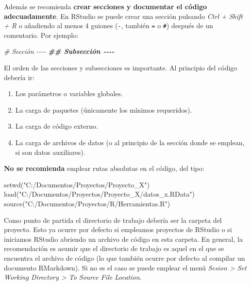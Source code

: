 \documentclass[
]{book}
\newenvironment{Shaded}{\begin{snugshade}}{\end{snugshade}}
\newcommand{\CommentTok}[1]{\textcolor[rgb]{0.56,0.35,0.01}{\textit{#1}}}
\newcommand{\DocumentationTok}[1]{\textcolor[rgb]{0.56,0.35,0.01}{\textbf{\textit{#1}}}}
\newcommand{\FunctionTok}[1]{\textcolor[rgb]{0.00,0.00,0.00}{#1}}
\newcommand{\NormalTok}[1]{#1}
\newcommand{\StringTok}[1]{\textcolor[rgb]{0.31,0.60,0.02}{#1}}
\providecommand{\tightlist}{%
  \setlength{\itemsep}{0pt}\setlength{\parskip}{0pt}}
\theoremstyle{break}
\theoremstyle{nonumberplain}
\begin{document}
Además se recomienda \textbf{crear secciones y documentar el código adecuadamente}.
En RStudio se puede crear una sección pulsando \emph{Ctrl + Shift + R} o añadiendo al menos 4 guiones (\texttt{-}, también \texttt{=} o \texttt{\#}) después de un comentario.
Por ejemplo:

\begin{Shaded}
\begin{Highlighting}[]
\CommentTok{\# Sección {-}{-}{-}{-}}
\DocumentationTok{\#\# Subsección {-}{-}{-}{-}}
\end{Highlighting}
\end{Shaded}

El orden de las secciones y subsecciones es importante.
Al principio del código debería ir:

\begin{enumerate}
\def\labelenumi{\arabic{enumi}.}
\tightlist
\item
  Los parámetros o variables globales.
\item
  La carga de paquetes (únicamente los mínimos requeridos).
\item
  La carga de código externo.
\item
  La carga de archivos de datos (o al principio de la sección donde se emplean, si son datos auxiliares).
\end{enumerate}

\textbf{No se recomienda} emplear rutas absolutas en el código, del tipo:

\begin{Shaded}
\begin{Highlighting}[]
\FunctionTok{setwd}\NormalTok{(}\StringTok{"C:/Documentos/Proyectos/Proyecto\_X"}\NormalTok{)}
\FunctionTok{load}\NormalTok{(}\StringTok{"C:/Documentos/Proyectos/Proyecto\_X/datos\_x.RData"}\NormalTok{)}
\FunctionTok{source}\NormalTok{(}\StringTok{"C:/Documentos/Proyectos/R/Herramientas.R"}\NormalTok{)}
\end{Highlighting}
\end{Shaded}

Como punto de partida el directorio de trabajo debería ser la carpeta del proyecto.
Esto ya ocurre por defecto si empleamos proyectos de RStudio o si iniciamos RStudio abriendo un archivo de código en esta carpeta.
En general, la recomendación es asumir que el directorio de trabajo es aquel en el que se encuentra el archivo de código (lo que también ocurre por defecto al compilar un documento RMarkdown).
Si no es el caso se puede emplear el menú \emph{Sesion \textgreater{} Set Working Directory \textgreater{} To Source File Location}.
\end{document}
